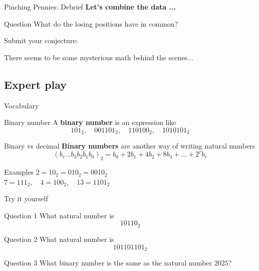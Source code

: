 \documentclass{beamer}
\begin{document}
\begin{frame}{Pinching Pennies: Debrief}
\pause
\textbf{Let's combine the data ...}
\pause
  \begin{block}{Question}
    What do the losing positions have in common?
  \end{block}
\pause
  \begin{block}{Submit your conjecture:}
    \begin{center}
    \end{center}
  \end{block}
\pause
  \begin{center}
    There seems to be some mysterious math behind the scenes...
  \end{center}
\end{frame}

\subsection{Expert play}

\begin{frame}{Vocabulary}
\pause
  \begin{block}{Binary number}
    A \textbf{binary number} is an expression like
      $$101_2,\quad001101_2,\quad 110100_2,\quad 1010101_2$$
  \end{block}
\pause
  \begin{block}{Binary vs decimal}
    \textbf{Binary numbers} are another way of writing natural numbers
      $$(b_r\dots b_3b_2b_1b_0)_2 = b_0 + 2b_1 + 4b_2 + 8b_3 + \dots + 2^rb_r$$
  \end{block}
\pause
  \begin{block}{Examples}
\pause
    $2 = 10_2 = 010_2 = 0010_2$\\
\pause
    $7 = 111_2,\quad 4 = 100_2, \quad 13 = 1101_2$
  \end{block}
\end{frame}

\begin{frame}{Try it yourself}
\pause
  \begin{block}{Question 1}
    What natural number is
      $$10110_2$$
  \end{block}
\pause
  \begin{block}{Question 2}
    What natural number is
      $$101101101_2$$
  \end{block}
\pause
  \begin{block}{Question 3}
    What binary number is the same as the natural number $2025$?
  \end{block}
\end{frame}
\end{document}
